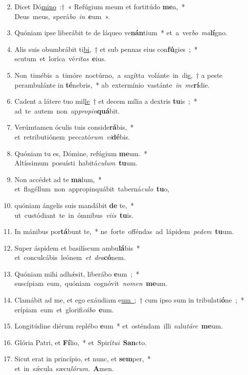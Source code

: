 \begin{flushleft}
\begin{enumerate}[leftmargin=*]
\setcounter{enumi}{1}
\item Dicet Dó\underline{mino}~:†~« Refúgium meum et fortitúdo \textbf{me}a,~* \mbox{Deus meus, sperá{\it bo} {\it in} \textbf{e}um~».}
\item Quóniam ipse liberábit te de láqueo ve\textbf{nán}tium~* \mbox{et a ver{\it bo} {\it ma}\textbf{lí}gno.}
\item Alis suis obumbrábit ti\underline{bi,}~† et sub pennas eius con\textbf{fú}gies~;~* \mbox{scutum et loríca vé{\it ri}{\it tas} \textbf{e}ius.}
\item \mbox{Non timébis a timóre noctúrno, a sagítta volánte in di\underline{e,}~†} a peste perambulánte in \textbf{té}nebris,~* \mbox{ab extermínio vastánte {\it in} {\it me}\textbf{rí}die.}
\item Cadent a látere tuo mil\underline{le}~† et decem mília a dextris \textbf{tu}is~;~* \mbox{ad te autem non ap{\it pro}{\it pin}\textbf{quá}bit.}
\item Verúmtamen óculis tuis conside\textbf{rá}bis,~* \mbox{et retributiónem peccató{\it rum} {\it vi}\textbf{dé}bis.}
\item Quóniam tu es, Dómine, refúgium \textbf{me}um.~* \mbox{Altíssimum posuísti habitá{\it cu}{\it lum} \textbf{tu}um.}
\item Non accédet ad te \textbf{ma}lum,~* \mbox{et flagéllum non appropinquábit taberná{\it cu}{\it lo} \textbf{tu}o,}
\item quóniam ángelis suis mandábit \textbf{de} te,~* \mbox{ut custódiant te in ómnibus {\it vi}{\it is} \textbf{tu}is.}
\item In mánibus por\textbf{tá}bunt te,~* \mbox{ne forte offéndas ad lápidem {\it pe}{\it dem} \textbf{tu}um.}
\item Super áspidem et basilíscum ambu\textbf{lá}bis~* \mbox{et conculcábis leónem {\it et} {\it dra}\textbf{có}nem.}
\item Quóniam mihi adh\'{\ae}sit, liberábo \textbf{e}um~;~* \mbox{suscípiam eum, quóniam cognóvit {\it no}{\it men} \textbf{me}um.}
\item Clamábit ad me, et ego exáudiam e\underline{um~;}~† cum ipso sum in tribulati\textbf{ó}ne~;~* \mbox{erípiam eum et glorifi{\it cá}{\it bo} \textbf{e}um.}
\item Longitúdine diérum replébo \textbf{e}um~* \mbox{et osténdam illi salu{\it tá}{\it re} \textbf{me}um.}
\item Glória Patri, et \textbf{Fí}lio,~* \mbox{et Spirí{\it tu}{\it i} \textbf{San}cto.}
\item Sicut erat in princípio, et nunc, et \textbf{sem}per,~* \mbox{et in s\'{\ae}cula sæcu{\it ló}{\it rum}. \textbf{A}men.}
\end{enumerate}
\end{flushleft}
